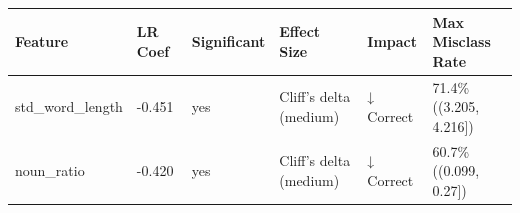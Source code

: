 \begin{tabular}{llllll}
\toprule
Feature & LR Coef & Significant & Effect Size & Impact & Max Misclass Rate \\
\midrule
std\_word\_length & -0.451 & yes & Cliff's delta (medium) & ↓ Correct & 71.4\% ((3.205, 4.216]) \\
noun\_ratio & -0.420 & yes & Cliff's delta (medium) & ↓ Correct & 60.7\% ((0.099, 0.27]) \\
\bottomrule
\end{tabular}
